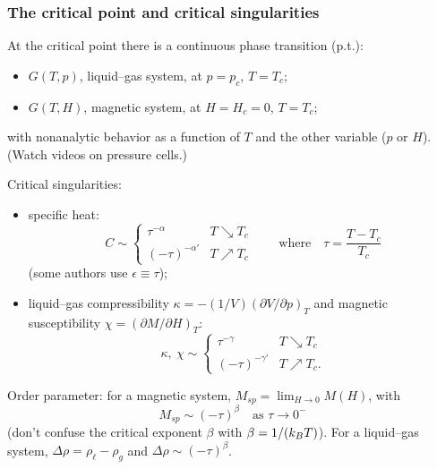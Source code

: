 \subsubsection*{The critical point and critical singularities}

At the critical point there is a continuous phase transition (p.t.):
\begin{itemize}
  \item $G(T,p)$, liquid--gas system, at $p = p_c$, $T = T_c$;
  \item $G(T,H)$, magnetic system, at $H = H_c = 0$, $T = T_c$;
\end{itemize}
with nonanalytic behavior as a function of $T$ and the other variable ($p$ or $H$).
(Watch videos on pressure cells.)

Critical singularities:
\begin{itemize}
  \item specific heat:
  \begin{equation}
    C\sim
    \begin{cases}
      \tau^{-\alpha} & T\searrow T_c\\
      (-\tau)^{-\alpha'} & T\nearrow T_c
    \end{cases}
    \qquad\text{where}\quad \tau = \frac{T-T_c}{T_c}
  \end{equation}
  (some authors use $\epsilon\equiv\tau$);
  \item liquid--gas compressibility $\kappa = -(1/V)\left(\partial V/\partial p\right)_T$
    and magnetic susceptibility $\chi = \left(\partial M/\partial H\right)_T$:
  \begin{equation}
    \kappa,\ \chi\sim
    \begin{cases}
      \tau^{-\gamma} & T\searrow T_c\\
      (-\tau)^{-\gamma'} & T\nearrow T_c.
    \end{cases}
  \end{equation}
\end{itemize}

Order parameter: for a magnetic system, $M_{sp} = \lim_{H\to 0}M(H)$, with
\begin{equation}
  M_{sp}\sim(-\tau)^{\beta}\quad\text{as } \tau\to 0^-
\end{equation}
(don't confuse the critical exponent $\beta$ with $\beta = 1/(k_{B} T)$). For a
liquid--gas system, $\Delta\rho = \rho_\ell-\rho_g$ and
$\Delta\rho\sim(-\tau)^{\beta}$.

\begin{diagram}
\end{diagram}

